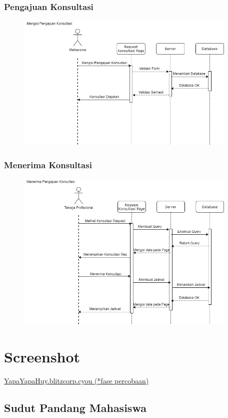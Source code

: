 \documentclass{article}
\begin{document}
	\subsubsection{Pengajuan Konsultasi}
	\begin{figure}[H]
		\centering
		\includegraphics[width=400px]{seq Mengajukan Konsultasi.png}
	\end{figure}

	\subsubsection{Menerima Konsultasi}
	\begin{figure}[H]
		\centering
		\includegraphics[width=400px]{seq Menerima Konsultasi (1).png}
	\end{figure}

	\section{Screenshot}
	\href{http://yapayapahuy.blitzcorp.cyou/}{YapaYapaHuy.blitzcorp.cyou (*fase percobaan)}
	\subsection{Sudut Pandang Mahasiswa}
\end{document}
